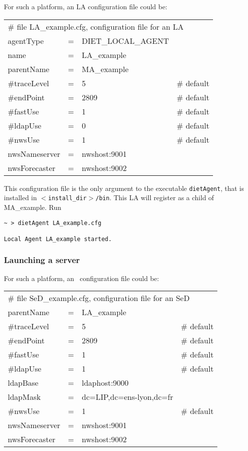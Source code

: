 For such a platform, an LA configuration file could be:
\tt
\begin{center}
 \footnotesize
 \begin{tabular}{lcll}
  \multicolumn{4}{l}{\# file LA\_example.cfg, configuration file for an LA}\\
  agentType    &=&DIET\_LOCAL\_AGENT&\\
  name         &=&LA\_example       &\\
  parentName   &=&MA\_example       &\\
  \#traceLevel &=&5                 &\# default\\
  \#endPoint   &=&2809              &\# default\\
  \#fastUse    &=&1                 &\# default\\
  \#ldapUse    &=&0                 &\# default\\
  \#nwsUse     &=&1                 &\# default\\
  nwsNameserver&=&nwshost:9001      &\\
  nwsForecaster&=&nwshost:9002      &\\
 \end{tabular}
\end{center}
\rm

This configuration file is the only argument to the executable
\texttt{dietAgent}, that is installed in
\texttt{$<$install\_dir$>$/bin}. This LA will register as a child of
MA\_example. Run {\footnotesize
\begin{verbatim}
~ > dietAgent LA_example.cfg

Local Agent LA_example started.
\end{verbatim}
}

\subsubsection{Launching a server}

For such a platform, an \sed\ configuration file could be:
\tt
\begin{center}
 \footnotesize
 \begin{tabular}{lcll}
  \multicolumn{4}{l}{\# file SeD\_example.cfg, configuration file for an SeD}\\
  parentName   &=&LA\_example        &\\
  \#traceLevel &=&5                 &\# default\\
  \#endPoint   &=&2809              &\# default\\
  \#fastUse    &=&1                 &\# default\\
  \#ldapUse    &=&1                 &\# default\\
  ldapBase     &=&ldaphost:9000     &\\
  ldapMask     &=&dc=LIP,dc=ens-lyon,dc=fr&\\
  \#nwsUse     &=&1                 &\# default\\
  nwsNameserver&=&nwshost:9001      &\\
  nwsForecaster&=&nwshost:9002      &\\
 \end{tabular}
\end{center}
\rm

